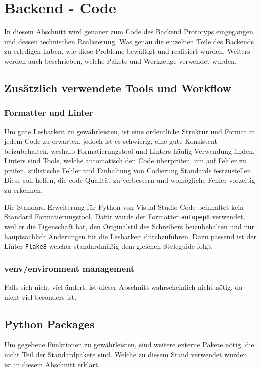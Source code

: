 \section{Backend - Code}
In diesem Abschnitt wird genauer zum Code des Backend Prototyps eingegangen 
und dessen technischen Realisierung. 
Was genau die einzelnen Teile des Backends zu erledigen haben, 
wie diese Probleme bewältigt und realisiert wurden.
Weiters werden auch beschrieben, welche Pakete und Werkzeuge verwendet wurden. 

\subsection{Zusätzlich verwendete Tools und Workflow}
\subsubsection{Formatter und Linter} 
Um gute Lesbarkeit zu gewährleisten, 
ist eine ordentliche Struktur und Format in jedem Code zu erwarten, 
jedoch ist es schwierig, eine gute Konsistent beizubehalten, 
weshalb Formatierungstool und Linters häufig Verwendung finden. 
% 
Linters sind Tools, welche automatisch den Code überprüfen, um auf Fehler zu prüfen, 
stilistische Fehler und Einhaltung von Codierung Standards festzustellen.
Diese soll helfen, die code Qualität zu verbessern 
und womögliche Fehler vorzeitig zu erkennen.

Die Standard Erweiterung für Python von Visual Studio Code 
beinhaltet kein Standard Formatierungstool.
Dafür wurde der Formatter \texttt{autopep8} verwendet, 
weil er die Eigenschaft hat, den Originalstil des Schreibers beizubehalten
und nur hauptsächlich Änderungen für die Lesbarkeit durchzuführen. 
Dazu passend ist der Linter \texttt{Flake8} welcher standardmäßig 
dem gleichen Styleguide  folgt.
\subsubsection{venv/environment management}
Falls sich nicht viel ändert, ist dieser Abschnitt wahrscheinlich nicht nötig, 
da nicht viel besonders ist.


\subsection{Python Packages}
Um gegebene Funktionen zu gewährleisten, sind weitere externe Pakete nötig, 
die nicht Teil der Standardpakete sind.
Welche zu diesem Stand verwendet wurden, ist in diesem Abschnitt erklärt.

